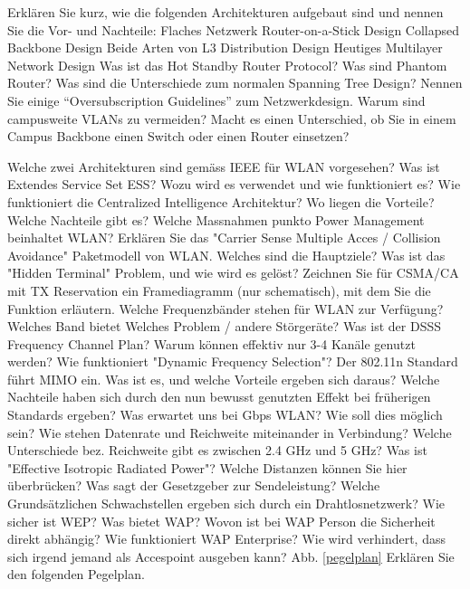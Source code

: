 \documentclass[ngerman,a4paper,12pt]{scrreprt}
\begin{document}
\olR
	\li Erklären Sie kurz, wie die folgenden Architekturen aufgebaut sind und nennen Sie die Vor- und Nachteile:
		\ol 
			\li Flaches Netzwerk
			\li Router-on-a-Stick Design
			\li Collapsed Backbone Design
			\li Beide Arten von L3 Distribution Design
			\li Heutiges Multilayer Network Design
		\olE
	\li Was ist das Hot Standby Router Protocol?
	\li Was sind Phantom Router?
	\li Was sind die Unterschiede zum normalen Spanning Tree Design?
	\li Nennen Sie einige "`Oversubscription Guidelines"' zum Netzwerkdesign.
	\li Warum sind campusweite VLANs zu vermeiden?
	\li Macht es einen Unterschied, ob Sie in einem Campus Backbone einen Switch oder einen Router einsetzen?
\olS


\olR
	\li Welche zwei Architekturen sind gemäss IEEE für WLAN vorgesehen?
	\li Was ist Extendes Service Set ESS? Wozu wird es verwendet und wie funktioniert es?
	\li Wie funktioniert die Centralized Intelligence Architektur? Wo liegen die Vorteile? Welche Nachteile gibt es?
	\li Welche Massnahmen punkto Power Management beinhaltet WLAN?
	\li Erklären Sie das "Carrier Sense Multiple Acces / Collision Avoidance" Paketmodell von WLAN. Welches sind die Hauptziele?
	\li Was ist das "Hidden Terminal" Problem, und wie wird es gelöst?
	\li Zeichnen Sie für CSMA/CA mit TX Reservation ein Framediagramm (nur schematisch), mit dem Sie die Funktion erläutern.
	\li Welche Frequenzbänder stehen für WLAN zur Verfügung? Welches Band bietet Welches Problem / andere Störgeräte?
	\li Was ist der DSSS Frequency Channel Plan? Warum können effektiv nur 3-4 Kanäle genutzt werden?
	\li Wie funktioniert "Dynamic Frequency Selection"?
	\li Der 802.11n Standard führt MIMO ein. Was ist es, und welche Vorteile ergeben sich daraus? Welche Nachteile haben sich durch den nun bewusst genutzten Effekt bei früherigen Standards ergeben?
	\li Was erwartet uns bei Gbps WLAN? Wie soll dies möglich sein?
	\li Wie stehen Datenrate und Reichweite miteinander in Verbindung? Welche Unterschiede bez. Reichweite gibt es zwischen 2.4 GHz und 5 GHz?
	\li Was ist "Effective Isotropic Radiated Power"? Welche Distanzen können Sie hier überbrücken? Was sagt der Gesetzgeber zur Sendeleistung?
	\li Welche Grundsätzlichen Schwachstellen ergeben sich durch ein Drahtlosnetzwerk?
	\li Wie sicher ist WEP? Was bietet WAP? Wovon ist bei WAP Person die Sicherheit direkt abhängig? Wie funktioniert WAP Enterprise? Wie wird verhindert, dass sich irgend jemand als Accespoint ausgeben kann?
	\li Abb. \ref{pegelplan} Erklären Sie den folgenden Pegelplan.
\end{document}
